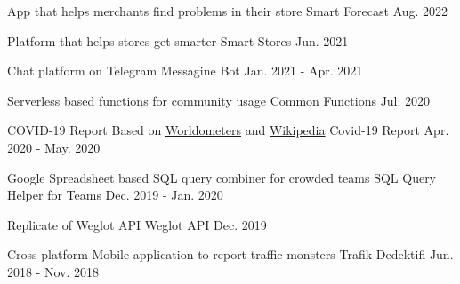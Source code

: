 

\begin{cventries}

  \cventry
    {App that helps merchants find problems in their store} %
    {Smart Forecast} %
    {} %
    {Aug. 2022} %
    {}

  \cventry
    {Platform that helps stores get smarter} %
    {Smart Stores} %
    {} %
    {Jun. 2021} %
    {}

  \cventry
    {Chat platform on Telegram} %
    {Messagine Bot} %
    {} %
    {Jan. 2021 - Apr. 2021} %
    {}

  \cventry
    {Serverless based functions for community usage} %
    {Common Functions} %
    {} %
    {Jul. 2020} %
    {}

  \cventry
    {COVID-19 Report Based on \href{https://www.worldometers.info/coronavirus}{Worldometers} and \href{https://en.wikipedia.org/wiki/COVID-19_pandemic}{Wikipedia}} %
    {Covid-19 Report} %
    {} %
    {Apr. 2020 - May. 2020} %
    {}

  \cventry
    {Google Spreadsheet based SQL query combiner for crowded teams} %
    {SQL Query Helper for Teams} %
    {} %
    {Dec. 2019 - Jan. 2020} %
    {}

  \cventry
    {Replicate of Weglot API} %
    {Weglot API} %
    {} %
    {Dec. 2019} %
    {}

  \cventry
    {Cross-platform Mobile application to report traffic monsters} %
    {Trafik Dedektifi} %
    {} %
    {Jun. 2018 - Nov. 2018} %
    {}


\end{cventries}
